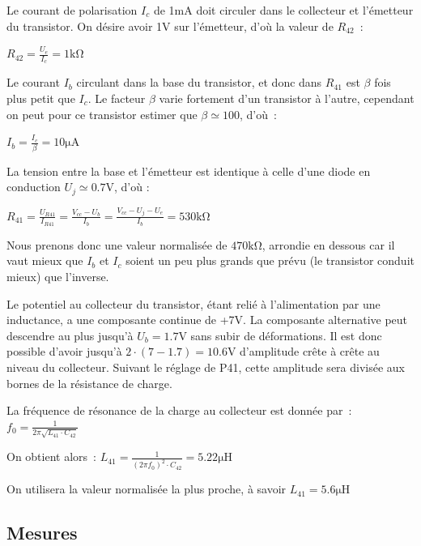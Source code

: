 \documentclass{article}
\begin{document}
Le courant de polarisation $I_c$ de 1mA doit circuler dans le collecteur et l'émetteur du transistor. On désire avoir 1V sur l'émetteur, d'où la valeur de $R_{42}$~:
\begin{center}
$R_{42} = \frac{U_e}{I_c} = 1\mathrm{k\Omega}$
\end{center}

Le courant $I_b$ circulant dans la base du transistor, et donc dans $R_{41}$ est $\beta$ fois plus petit que $I_c$.
Le facteur $\beta$ varie fortement d'un transistor à l'autre, cependant on peut pour ce transistor estimer que $\beta \simeq 100$, d'où~:
\begin{center}
$I_b = \frac{I_c}{\beta} = 10\mathrm{\mu A}$
\end{center}

La tension entre la base et l'émetteur est identique à celle d'une diode en conduction $U_j \simeq 0.7$V, d'où :
\begin{center}
$R_{41} = \frac{U_{R41}}{I_{R41}} = \frac{V_{cc} - U_b}{I_b} = \frac{V_{cc} - U_j - U_e}{I_b} = 530\mathrm{k\Omega}$
\end{center}

Nous prenons donc une valeur normalisée de $470\mathrm{k\Omega}$, arrondie en dessous car il vaut mieux que $I_b$ et $I_c$ soient un peu plus grands que prévu (le transistor conduit mieux) que l'inverse.




Le potentiel au collecteur du transistor, étant relié à l'alimentation par une inductance, a une composante continue de +7V.
La composante alternative peut descendre au plus jusqu'à ${U_b = 1.7\mathrm{V}}$ sans subir de déformations. Il est donc possible d'avoir jusqu'à ${2\cdot(7-1.7)=10.6\mathrm{V}}$ d'amplitude crête à crête au niveau du collecteur.
Suivant le réglage de P41, cette amplitude sera divisée aux bornes de la résistance de charge.


La fréquence de résonance de la charge au collecteur est donnée par~: $f_0 = \frac{1}{2\pi \sqrt{L_{41} \cdot C_{42}}}$

On obtient alors~: $L_{41} = \frac{1}{(2\pi f_0)^2 \cdot C_{42}} = 5.22 \mathrm{\mu H}$

On utilisera la valeur normalisée la plus proche, à savoir $L_{41} = 5.6 \mathrm{\mu H}$

\subsection{Mesures}
\end{document}
